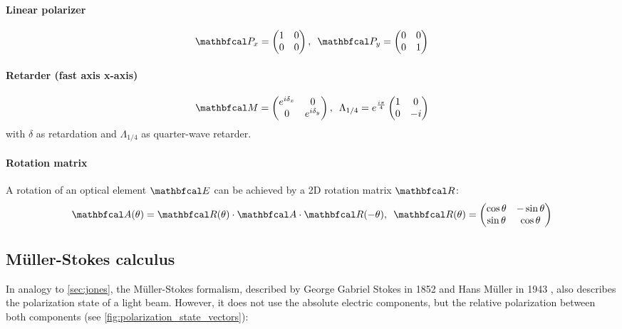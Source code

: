 \paragraph{Linear polarizer}
\begin{align}
\mat{P}_x =
\begin{pmatrix}
1 & 0 \\ 0 & 0
\end{pmatrix}
, \enspace
\mat{P}_y =
\begin{pmatrix}
0 & 0 \\ 0 & 1
\end{pmatrix}
\end{align}
%
\paragraph{Retarder (fast axis x-axis)}
\begin{align}
\mat{M} =
\begin{pmatrix}
e^{i \delta_x} & 0 \\ 0 & e^{i \delta_y}
\end{pmatrix}
, \enspace
%
\Lambda_{1/4}=
e^{\frac{i \pi}{4}}
\begin{pmatrix}
1 & 0 \\ 0 & -i
\end{pmatrix}
\end{align}
%
with $\delta$ as retardation and $\Lambda_{1/4}$ as quarter-wave retarder.
%
\paragraph{Rotation matrix}
A rotation of an optical element $\mat{E}$ can be achieved by a 2D rotation matrix $\mat{R}$:
\begin{align}
\begin{split}\label{eq::JonesRotation}
\mat{A}(\theta )=\mat{R}(\theta )\cdot\mat{A}\cdot\mat{R}(-\theta )
, \enspace
\mat{R}(\theta ) =
\begin{pmatrix}
\cos \theta & -\sin \theta \\
\sin \theta & \cos \theta
\end{pmatrix}
\end{split}
\end{align}
%
%
%
\subsection{M{\"u}ller-Stokes calculus}\label{sec:MuellerStokes}
%
In analogy to \cref{sec:jones}, the M{\"u}ller-Stokes formalism, described by George Gabriel Stokes in 1852 \cite{stokes1852composition} and Hans M{\"u}ller in 1943 \cite{mueller1943memorandum}, also describes the polarization state of a light beam.
However, it does not use the absolute electric components, but the relative polarization between both components (see \cref{fig:polarization_state_vectors}):
%
